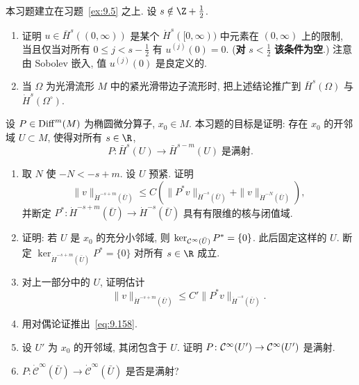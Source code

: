 \begin{exer}[可延拓空间与具支空间的关系 II]\label{ex:9.6}
本习题建立在习题~\ref{ex:9.5} 之上. 设 $s \notin \Z + \frac12$.
\begin{enumerate}[label=(\arabic*)]
    \item 证明 $u \in \bar{H}^s((0, \infty))$ 是某个 $\dot{H}^s([0, \infty))$ 中元素在 $(0, \infty)$ 上的限制, 当且仅当对所有 $0 \le j < s - \frac12$ 有 $u^{(j)}(0) = 0$. (\textbf{对} $s < \frac12$ \textbf{该条件为空}.) 注意由 Sobolev 嵌入, 值 $u^{(j)}(0)$ 是良定义的.
    \item 当 $\Omega$ 为光滑流形 $M$ 中的紧光滑带边子流形时, 把上述结论推广到 $\bar{H}^s(\Omega)$ 与 $\dot{H}^s(\Omega^\circ)$.
\end{enumerate}
\end{exer}

\begin{exer}\label{ex:9.7}
设 $P \in \operatorname{Diff}^m(M)$ 为椭圆微分算子, $x_0 \in M$. 本习题的目标是证明: 存在 $x_0$ 的开邻域 $U \subset M$, 使得对所有 $s \in \R$,
\begin{equation}\label{eq:9.158}
    P \colon \bar{H}^s(U) \to \bar{H}^{s-m}(U) \; \text{是满射}.
\end{equation}
\begin{enumerate}[label=(\arabic*)]
    \item 取 $N$ 使 $-N < -s + m$. 设 $U$ 预紧. 证明
    \begin{equation}\label{eq:9.159}
        \|v\|_{\dot{H}^{-s+m}(\bar U)} \le C \left( \|P^* v\|_{\dot{H}^{-s}(\bar U)} + \|v\|_{\dot{H}^{-N}(\bar U)} \right),
    \end{equation}
    并断定 $P^* \colon \dot{H}^{-s+m}(\bar U) \to \dot{H}^{-s}(\bar U)$ 具有有限维的核与闭值域.
    \item 证明: 若 $U$ 是 $x_0$ 的充分小邻域, 则 $\ker_{\mathcal{C}^\infty(\bar U)} P^* = \{0\}$. 此后固定这样的 $U$. 断定 $\ker_{\dot{H}^{-s+m}(\bar U)} P^* = \{0\}$ 对所有 $s \in \R$ 成立.
    \item 对上一部分中的 $U$, 证明估计
    \begin{equation}\label{eq:9.160}
        \|v\|_{\dot{H}^{-s+m}(\bar U)} \le C' \|P^* v\|_{\dot{H}^{-s}(\bar U)}.
    \end{equation}
    \item 用对偶论证推出~\eqref{eq:9.158}.
    \item 设 $U'$ 为 $x_0$ 的开邻域, 其闭包含于 $U$. 证明 $P \colon \mathcal{C}^\infty(U') \to \mathcal{C}^\infty(U')$ 是满射.
    \item $P \colon \dot{\mathcal{C}}^\infty(\bar U) \to \dot{\mathcal{C}}^\infty(\bar U)$ 是否是满射?
\end{enumerate}
\end{exer}

